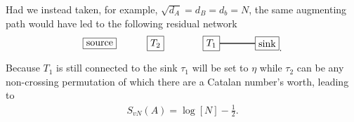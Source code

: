 \documentclass[a4paper,11pt]{article}
\begin{document}
Had we instead taken, for example, $\sqrt{d_A} = d_B = d_b = N$, the same augmenting path would have led to the following residual network
\begin{align}
\begin{tikzpicture}
    \node[draw, shape=rectangle] (T1) at (2,0) {$T_1$};
    \node[draw, shape=rectangle] (T2) at (0,0) {$T_2$};
    \node[draw, shape=rectangle] (so) at (-2,0) {source};
    \node[draw, shape=rectangle] (si) at (4,0) {sink};
    \draw [thick] (T1) -- (si);
    \end{tikzpicture}.
\end{align}
Because $T_1$ is still connected to the sink $\tau_1$ will be set to $\eta$ while $\tau_2$ can be any non-crossing permutation of which there are a Catalan number's worth, leading to 
\begin{align}
    S_{vN}(A) = \log\left[N\right] -\frac{1}{2}.
\end{align}
\end{document}
